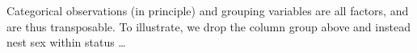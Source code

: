 \documentclass[]{article}
\newenvironment{Shaded}{\begin{snugshade}}{\end{snugshade}}
\newcommand{\DataTypeTok}[1]{\textcolor[rgb]{0.13,0.29,0.53}{#1}}
\newcommand{\KeywordTok}[1]{\textcolor[rgb]{0.13,0.29,0.53}{\textbf{#1}}}
\newcommand{\NormalTok}[1]{#1}
\newcommand{\OperatorTok}[1]{\textcolor[rgb]{0.81,0.36,0.00}{\textbf{#1}}}
\newcommand{\StringTok}[1]{\textcolor[rgb]{0.31,0.60,0.02}{#1}}
\begin{document}
Categorical observations (in principle) and grouping variables are all
factors, and are thus transposable. To illustrate, we drop the column
group above and instead nest sex within status \ldots{}

\begin{Shaded}
\end{Shaded}
\end{document}
